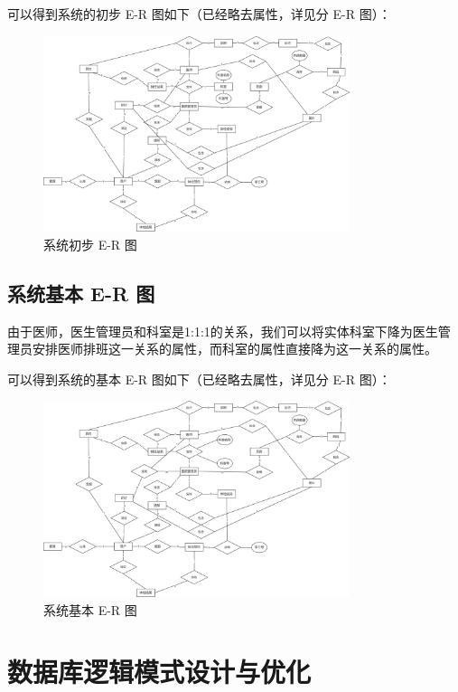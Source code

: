 \documentclass{article}
\begin{document}
可以得到系统的初步 E-R 图如下（已经略去属性，详见分 E-R 图）：

\begin{figure}[H]
    \centering
    \includegraphics[width=0.8\textwidth]{images/initER.png}
    \caption{系统初步 E-R 图}
\end{figure}

\subsection{系统基本 E-R 图}

由于医师，医生管理员和科室是1:1:1的关系，我们可以将实体科室下降为医生管理员安排医师排班这一关系的属性，而科室的属性直接降为这一关系的属性。

可以得到系统的基本 E-R 图如下（已经略去属性，详见分 E-R 图）：

\begin{figure}[H]
    \centering
    \includegraphics[width=0.8\textwidth]{images/basicER.png}
    \caption{系统基本 E-R 图}
\end{figure}

\section{数据库逻辑模式设计与优化}
\end{document}
